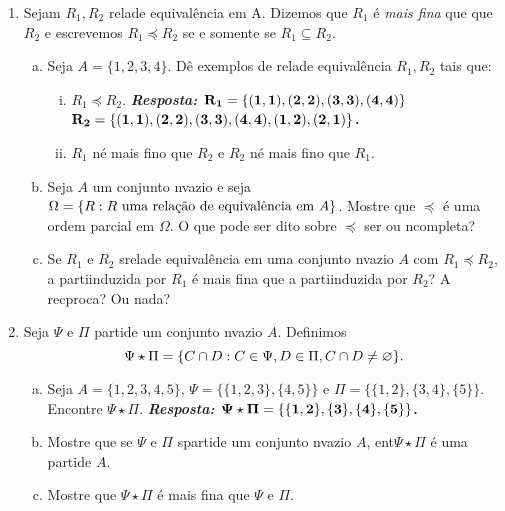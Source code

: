\begin{enumerate}[{\bf 1.}]
\item Sejam $R_1,R_2$ rela\coes de equival\^encia em A. Dizemos que $R_1$ \'e {\it mais fina} que que $R_2$ e escrevemos $R_1\preceq R_2$ se e somente se $R_1\subseteq R_2$.
\begin{enumerate}[a)]
\item Seja $A=\{1,2,3,4\}$. D\^e exemplos de rela\coes de equival\^encia $R_1,R_2$ tais que:
\begin{enumerate}[i)]
\item $R_1\preceq R_2$. 
{\bf{\it Resposta:} ${\bf R_1=\{(1,1),(2,2),(3,3),(4,4)\}}$ ${\bf R_2=\{(1,1),(2,2),(3,3),(4,4),(1,2),(2,1)\}}$.}
\item $R_1$ n\ao \'e mais fino que $R_2$ e $R_2$ n\ao \'e mais fino que $R_1$. 
\end{enumerate}
\item Seja $A$ um conjunto n\ao vazio e seja $\Omega=\{R: R \textrm{ uma rela\cao de equival\^encia em $A$}\}$. Mostre que $\preceq$ \'e uma ordem parcial em $\Omega$. O que pode ser dito sobre $\preceq$ ser ou n\ao completa?
\item Se $R_1$ e $R_2$ s\ao rela\coes de equival\^encia em uma conjunto n\ao vazio $A$ com $R_1\preceq R_2$, a parti\cao induzida por $R_1$ \'e mais fina que a parti\cao induzida por $R_2$? A rec\ih proca? Ou nada?
\end{enumerate}

\item\label{eqexcer7} Seja $\Psi$ e $\Pi$ parti\coes de um conjunto n\ao vazio $A$. Definimos
\[
\Psi\star\Pi=\{C\cap D: C\in\Psi, D\in\Pi,C\cap D\neq\varnothing\}.
\]
\begin{enumerate}[a)]
\item Seja $A=\{1,2,3,4,5\}$, $\Psi=\{\{1,2,3\},\{4,5\}\}$ e $\Pi=\{\{1,2\},\{3,4\},\{5\}\}$. Encontre $\Psi\star\Pi$.
{\bf{\it Resposta:} ${\bf \Psi\star\Pi=\{\{1,2\},\{3\},\{4\},\{5\}\}}$.}
\item Mostre que se $\Psi$ e $\Pi$ s\ao parti\coes de um conjunto n\ao vazio $A$, ent\ao $\Psi\star\Pi$ \'e uma parti\cao de $A$.
\item Mostre que $\Psi\star\Pi$ \'e mais fina que $\Psi$ e $\Pi$.
\end{enumerate}


\end{enumerate}
